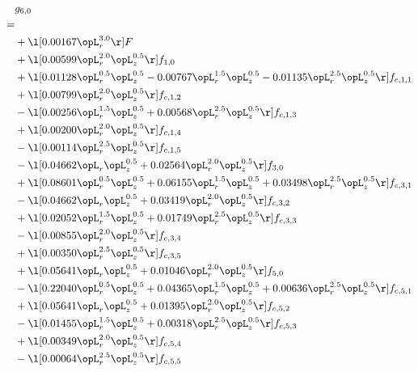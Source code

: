 \begin{alignat}{2} 
\label{eq:g_60_0} 
& g_{6,0} \nonumber \\ 
 = \\ 
& + \l[  0.00167 \opL_r^{3.0}  \r] F \nonumber \\ 
& + \l[  0.00599 \opL_r^{2.0} \opL_z^{0.5}  \r] f_{1,0} \nonumber \\ 
& + \l[  0.01128 \opL_r^{0.5} \opL_z^{0.5}   -0.00767 \opL_r^{1.5} \opL_z^{0.5}   -0.01135 \opL_r^{2.5} \opL_z^{0.5}  \r] f_{c,1,1} \nonumber \\ 
& + \l[  0.00799 \opL_r^{2.0} \opL_z^{0.5}  \r] f_{c,1,2} \nonumber \\ 
& - \l[  0.00256 \opL_r^{1.5} \opL_z^{0.5} +  0.00568 \opL_r^{2.5} \opL_z^{0.5}  \r] f_{c,1,3} \nonumber \\ 
& + \l[  0.00200 \opL_r^{2.0} \opL_z^{0.5}  \r] f_{c,1,4} \nonumber \\ 
& - \l[  0.00114 \opL_r^{2.5} \opL_z^{0.5}  \r] f_{c,1,5} \nonumber \\ 
& - \l[  0.04662 \opL_r \opL_z^{0.5} +  0.02564 \opL_r^{2.0} \opL_z^{0.5}  \r] f_{3,0} \nonumber \\ 
& + \l[  0.08601 \opL_r^{0.5} \opL_z^{0.5} +  0.06155 \opL_r^{1.5} \opL_z^{0.5} +  0.03498 \opL_r^{2.5} \opL_z^{0.5}  \r] f_{c,3,1} \nonumber \\ 
& - \l[  0.04662 \opL_r \opL_z^{0.5} +  0.03419 \opL_r^{2.0} \opL_z^{0.5}  \r] f_{c,3,2} \nonumber \\ 
& + \l[  0.02052 \opL_r^{1.5} \opL_z^{0.5} +  0.01749 \opL_r^{2.5} \opL_z^{0.5}  \r] f_{c,3,3} \nonumber \\ 
& - \l[  0.00855 \opL_r^{2.0} \opL_z^{0.5}  \r] f_{c,3,4} \nonumber \\ 
& + \l[  0.00350 \opL_r^{2.5} \opL_z^{0.5}  \r] f_{c,3,5} \nonumber \\ 
& + \l[  0.05641 \opL_r \opL_z^{0.5} +  0.01046 \opL_r^{2.0} \opL_z^{0.5}  \r] f_{5,0} \nonumber \\ 
& - \l[  0.22040 \opL_r^{0.5} \opL_z^{0.5} +  0.04365 \opL_r^{1.5} \opL_z^{0.5} +  0.00636 \opL_r^{2.5} \opL_z^{0.5}  \r] f_{c,5,1} \nonumber \\ 
& + \l[  0.05641 \opL_r \opL_z^{0.5} +  0.01395 \opL_r^{2.0} \opL_z^{0.5}  \r] f_{c,5,2} \nonumber \\ 
& - \l[  0.01455 \opL_r^{1.5} \opL_z^{0.5} +  0.00318 \opL_r^{2.5} \opL_z^{0.5}  \r] f_{c,5,3} \nonumber \\ 
& + \l[  0.00349 \opL_r^{2.0} \opL_z^{0.5}  \r] f_{c,5,4} \nonumber \\ 
& - \l[  0.00064 \opL_r^{2.5} \opL_z^{0.5}  \r] f_{c,5,5} \nonumber \\ 
\end{alignat} 


